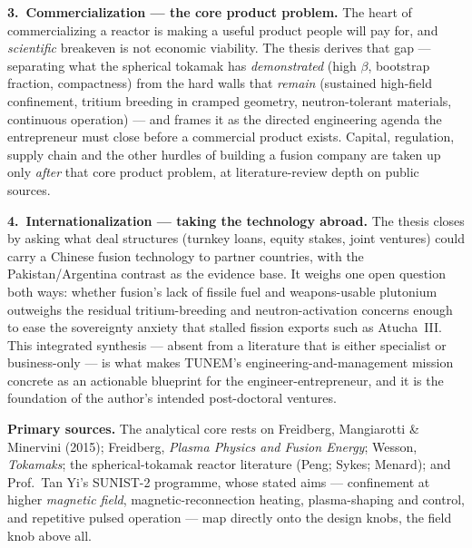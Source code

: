 \documentclass[11pt]{article}
\begin{document}
\textbf{3.~Commercialization --- the core product problem.} The heart of commercializing a reactor is making a useful product people will pay for, and \emph{scientific} breakeven is not economic viability. The thesis derives that gap --- separating what the spherical tokamak has \emph{demonstrated} (high $\beta$, bootstrap fraction, compactness) from the hard walls that \emph{remain} (sustained high-field confinement, tritium breeding in cramped geometry, neutron-tolerant materials, continuous operation) --- and frames it as the directed engineering agenda the entrepreneur must close before a commercial product exists. Capital, regulation, supply chain and the other hurdles of building a fusion company are taken up only \emph{after} that core product problem, at literature-review depth on public sources.

\textbf{4.~Internationalization --- taking the technology abroad.} The thesis closes by asking what deal structures (turnkey loans, equity stakes, joint ventures) could carry a Chinese fusion technology to partner countries, with the Pakistan/Argentina contrast as the evidence base. It weighs one open question both ways: whether fusion's lack of fissile fuel and weapons-usable plutonium outweighs the residual tritium-breeding and neutron-activation concerns enough to ease the sovereignty anxiety that stalled fission exports such as Atucha~III. This integrated synthesis --- absent from a literature that is either specialist or business-only --- is what makes TUNEM's engineering-and-management mission concrete as an actionable blueprint for the engineer-entrepreneur, and it is the foundation of the author's intended post-doctoral ventures.

\textbf{Primary sources.} The analytical core rests on Freidberg, Mangiarotti \& Minervini (2015); Freidberg, \emph{Plasma Physics and Fusion Energy}; Wesson, \emph{Tokamaks}; the spherical-tokamak reactor literature (Peng; Sykes; Menard); and Prof.\ Tan Yi's SUNIST-2 programme, whose stated aims --- confinement at higher \emph{magnetic field}, magnetic-reconnection heating, plasma-shaping and control, and repetitive pulsed operation --- map directly onto the design knobs, the field knob above all.
\end{document}
